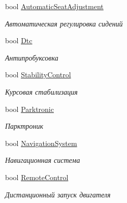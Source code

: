 \begin{DoxyCompactItemize}
bool \hyperlink{class_r_t_1_1_parsing_libs_1_1_models_1_1_automoto_additional_info_a1cd33e4d174a6216bc0886dc220ef0b6}{Automatic\+Seat\+Adjustment}
\begin{DoxyCompactList}\small\item\em Автоматическая регулировка сидений \end{DoxyCompactList}\item 
bool \hyperlink{class_r_t_1_1_parsing_libs_1_1_models_1_1_automoto_additional_info_ab848c01f31bd6db32634007270d0baf9}{Dtc}
\begin{DoxyCompactList}\small\item\em Антипробуксовка \end{DoxyCompactList}\item 
bool \hyperlink{class_r_t_1_1_parsing_libs_1_1_models_1_1_automoto_additional_info_aca40b64b593ffc7d9bb0b9bdac0bf1a0}{Stability\+Control}
\begin{DoxyCompactList}\small\item\em Курсовая стабилизация \end{DoxyCompactList}\item 
bool \hyperlink{class_r_t_1_1_parsing_libs_1_1_models_1_1_automoto_additional_info_addd555bd0746a4f0d134281ad7ca5edc}{Parktronic}
\begin{DoxyCompactList}\small\item\em Парктроник \end{DoxyCompactList}\item 
bool \hyperlink{class_r_t_1_1_parsing_libs_1_1_models_1_1_automoto_additional_info_a73163fa632807772b1074c133c3ba3c3}{Navigation\+System}
\begin{DoxyCompactList}\small\item\em Навигационная система \end{DoxyCompactList}\item 
bool \hyperlink{class_r_t_1_1_parsing_libs_1_1_models_1_1_automoto_additional_info_ad230271c2092d8fc7087409ee9e817ad}{Remote\+Control}
\begin{DoxyCompactList}\small\item\em Дистанционный запуск двигателя \end{DoxyCompactList}\item 

\end{DoxyCompactItemize}
